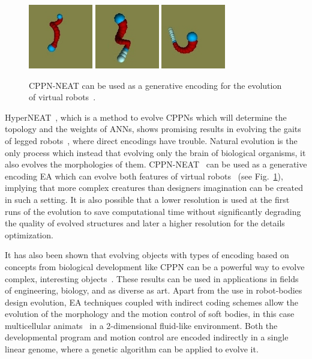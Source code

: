 \begin{figure}[t!]
\centering
\includegraphics[width=0.25\textwidth,height=0.2\textwidth]{../Figures/Misc/auerbach1.png}
\includegraphics[width=0.25\textwidth,height=0.2\textwidth]{../Figures/Misc/auerbach2.png}
\includegraphics[width=0.25\textwidth,height=0.2\textwidth]{../Figures/Misc/auerbach3.png}
\caption{CPPN-NEAT can be used as a generative encoding for the evolution of virtual robots~\citep{auerbach2010dynamic}.}
\label{fig:auerbach}
\end{figure}

HyperNEAT~\citep{stanley2009hypercube}, which is a method to evolve CPPNs which will determine the topology and the weights of ANNs, shows promising results in evolving the gaits of legged robots~\citep{clune2009evolving}, where direct encodings have trouble. Natural evolution is the only process which instead that evolving only the brain of biological organisms, it also evolves the morphologies of them. CPPN-NEAT~\citep{stanley2007compositional} can be used as a generative encoding EA which can evolve both features of virtual robots~\citep{auerbach2010dynamic, auerbach2010evolving} (see Fig.~\ref{fig:auerbach}), implying that more complex creatures than designers imagination can be created in such a setting. It is also possible that a lower resolution is used at the first runs of the evolution to save computational time without significantly degrading the quality of evolved structures and later a higher resolution for the details optimization.

It has also been shown that evolving objects with types of encoding based on concepts from biological development like CPPN can be a powerful way to evolve complex, interesting objects~\citep{clune2011evolving}. These results can be used in applications in fields of engineering, biology, and as diverse as art. Apart from the use in robot-bodies design evolution, EA techniques coupled with indirect coding schemes allow the evolution of the morphology and the motion control of soft bodies, in this case  multicellular animats~\citep{joachimczak2012co} in a 2-dimensional fluid-like environment. Both the developmental program and motion control are encoded indirectly in a single linear genome, where a genetic algorithm can be applied to evolve it.


